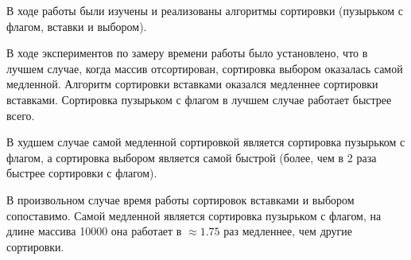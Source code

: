 \Conclusion
    В ходе работы были изучены и реализованы алгоритмы сортировки
    (пузырьком с флагом, вставки и выбором).
    
    В ходе экспериментов по замеру времени работы было установлено, что 
    в лучшем случае, когда массив отсортирован, сортировка выбором оказалась самой медленной.
    Алгоритм сортировки вставками оказался медленнее сортировки вставками.
    Сортировка пузырьком с флагом в лучшем случае работает быстрее всего.

    В худшем случае самой медленной сортировкой является сортировка пузырьком с флагом,
    а сортировка выбором является самой быстрой (более, чем в 2 раза быстрее сортировки с флагом).

    В произвольном случае время работы сортировок вставками и выбором сопоставимо.
    Самой медленной является сортировка пузырьком с флагом,
    на длине массива 10000 она работает в $ \approx 1.75 $ раз медленнее,
    чем другие сортировки.

